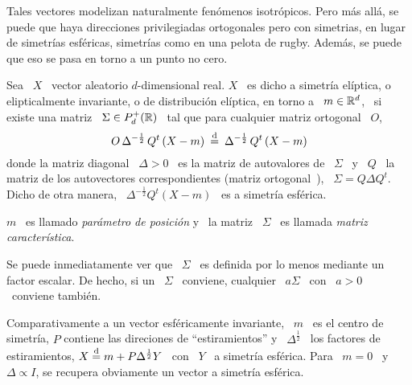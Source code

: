 Tales  vectores  modelizan naturalmente  fen\'omenos  isotr\'opicos. Pero  m\'as
all\'a,  se  puede  que  haya  direcciones privilegiadas  ortogonales  pero  con
simetrias,  \ie en  lugar de  simetr\'ias esf\'ericas,  simetr\'ias como  en una
pelota de rugby. Adem\'as, se puede que eso se pasa en torno a un punto no cero.
%
\begin{definicion}
  Sea  \  $X$  \ vector  aleatorio  $d$-dimensional  real.   $X$  \ es  dicho  a
  simetr\'ia  el\'iptica,   o  elipticalmente  invariante,   o  de  distribuci\'on
  el\'iptica, en torno a \ $m \in  \mathbb{R}^d$, \ si existe una matriz \ $\Sigma \in
  P_d^+(\mathbb{R})$ \ tal que para cualquier matriz ortogonal \ $O$,
  \[
  O  \,   \Delta^{-\frac12}  \,  Q^t  \left(   X  -  m  \right)   \:  \stackrel{\mathrm{d}}{=}  \:
  \Delta^{-\frac12} \, Q^t \left( X - m \right)
  \]
  donde la  matriz diagonal \ $\Delta > 0$ \ es  la matriz de  autovalores de \
  $\Sigma$ \  y \ $Q$ \  la matriz de los  autovectores correspondientes (matriz
  ortogonal~\cite{Bha97, Bha07, HorJoh13}), \ $\Sigma  = Q \Delta Q^t$. Dicho de
  otra manera, \ $\Delta^{-\frac12} Q^t \left(  X - m \right)$ \ es a simetr\'ia
  esf\'erica.

  $m$ \ es llamado {\em par\'ametro de posici\'on} y \ la matriz \ $\Sigma$ \ es
  llamada {\em matriz caracter\'istica}.
\end{definicion}
%
Se puede inmediatamente  ver que \ $\Sigma$ \ es definida  por lo menos mediante
un factor escalar. De hecho, si un \ $\Sigma$ \ conviene, cualquier \ $a \Sigma$
\ con \ $a > 0$ \ conviene tambi\'en.

Comparativamente a un  vector esf\'ericamente invariante, \ $m$ \  es el centro de
simetr\'ia,   $P$   contiene   las   direciones   de   ``estiramientos''   y   \
$\Delta^{\frac12}$  \   los  factores  de   estiramientos,  $X  \stackrel{\mathrm{d}}{=}  m   +  P
\Delta^{\frac12} Y$ \  con \ $Y$ \ a simetr\'ia  esf\'erica. Para \ $m =  0$ \ y \
$\Delta \propto I$, se recupera obviamente un vector a simetr\'ia esf\'erica.


